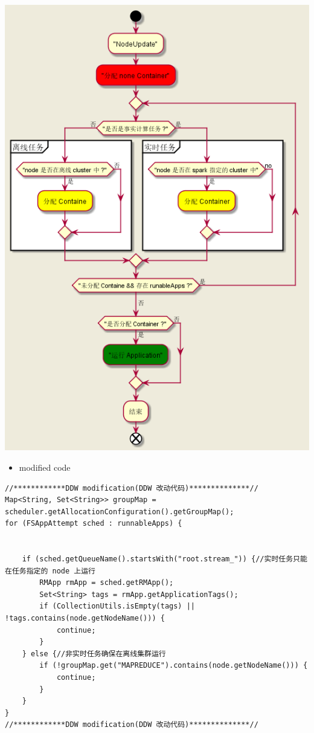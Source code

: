 \documentclass[11pt]{article}
\begin{document}
\begin{center}
\includegraphics[width=.9\linewidth]{../images/yarn-insulate-with-streaming-and-mapreduce.png}
\end{center}

\begin{itemize}
\item modified code
\end{itemize}
\begin{verbatim}
//************DDW modification(DDW 改动代码)**************//
Map<String, Set<String>> groupMap = scheduler.getAllocationConfiguration().getGroupMap();
for (FSAppAttempt sched : runnableApps) {


    if (sched.getQueueName().startsWith("root.stream_")) {//实时任务只能在任务指定的 node 上运行
        RMApp rmApp = sched.getRMApp();
        Set<String> tags = rmApp.getApplicationTags();
        if (CollectionUtils.isEmpty(tags) || !tags.contains(node.getNodeName())) {
            continue;
        }
    } else {//非实时任务确保在离线集群运行
        if (!groupMap.get("MAPREDUCE").contains(node.getNodeName())) {
            continue;
        }
    }
}
//************DDW modification(DDW 改动代码)**************//
\end{verbatim}
\end{document}

